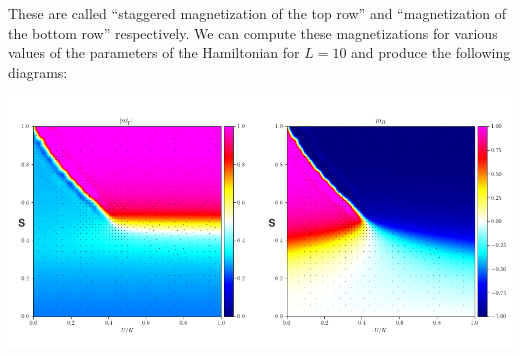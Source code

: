 \documentclass[
  american,aps,pra,reprint,floatfix,nofootinbib,superscriptaddress
]{revtex4-2}
\begin{document}
These are called ``staggered magnetization of the top row'' and ``magnetization
of the bottom row'' respectively. We can compute these magnetizations for various
values of the parameters of the Hamiltonian for $L=10$ and produce the
following diagrams:

\includegraphics[width=\dimexpr\columnwidth-10.0pt]{lanczos_chi0_gp.png}
\end{document}
